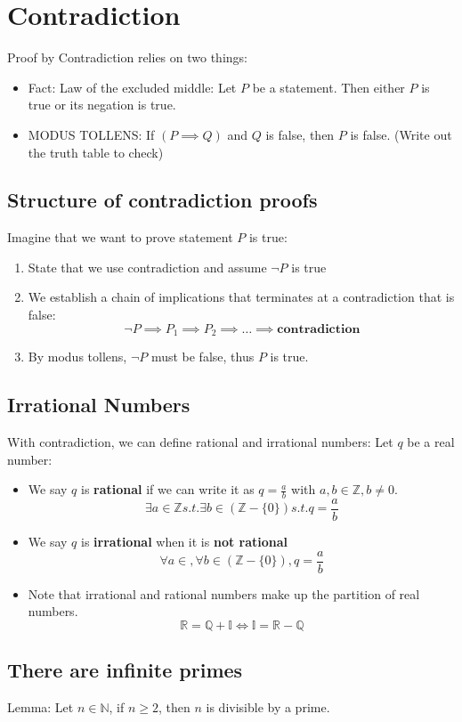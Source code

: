 \documentclass[letterpaper,12pt]{article}
\begin{document}
\section{Contradiction}
Proof by Contradiction relies on two things:
\begin{itemize}
    \item Fact: Law of the excluded middle: Let $P$ be a statement. Then either $P$ is true or its negation is true.
    \item MODUS TOLLENS: If $(P\implies Q)$ and $Q$ is false, then $P$ is false. (Write out the truth table to check)
\end{itemize}
\subsection{Structure of contradiction proofs}
Imagine that we want to prove statement $P$ is true:
\begin{enumerate}
    \item State that we use contradiction and assume $\neg P$ is true
    \item We establish a chain of implications that terminates at a contradiction that is false: \[\neg P\implies P_1\implies P_2 \implies \ldots \implies \textbf{contradiction}\]
    \item By modus tollens, $\neg P$ must be false, thus $P$ is true.
\end{enumerate}
\subsection{Irrational Numbers}
With contradiction, we can define rational and irrational numbers:
Let $q$ be a real number:
\begin{itemize}
    \item We say $q$ is \textbf{rational} if we can write it as $q=\frac{a}{b}$ with $a,b\in \mathbb{Z},b\neq 0$. \[\exists a\in \mathbb{Z}s.t.\exists b\in (\mathbb{Z}-\{0\})s.t.q=\frac{a}{b}\]
    \item We say $q$ is \textbf{irrational} when it is \textbf{not rational}\[\forall a\in \mathbb,\forall b\in (\mathbb{Z}-\{0\}),q=\frac{a}{b}\]
    \item Note that irrational and rational numbers make up the partition of real numbers. \[\mathbb{R}=\mathbb{Q}+\mathbb{I} \iff \mathbb{I}=\mathbb{R}-\mathbb{Q} \]
\end{itemize}
\subsection{There are infinite primes}
Lemma: Let $n\in\mathbb{N}$, if $n\ge 2$, then $n$ is divisible by a prime.
\end{document}
